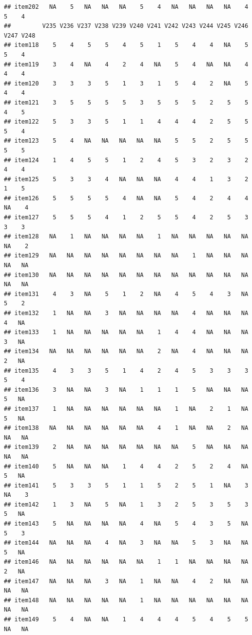\documentclass[
  man]{apa6}
\begin{document}
\begin{verbatim}
## item202   NA    5   NA   NA   NA    5    4   NA   NA   NA   NA    4    5    4
##         V235 V236 V237 V238 V239 V240 V241 V242 V243 V244 V245 V246 V247 V248
## item118    5    4    5    5    4    5    1    5    4    4   NA    5    5    4
## item119    3    4   NA    4    2    4   NA    5    4   NA   NA    4    4    4
## item120    3    3    3    5    1    3    1    5    4    2   NA    5    4    4
## item121    3    5    5    5    5    3    5    5    5    2    5    5    4    5
## item122    5    3    3    5    1    1    4    4    4    2    5    5    5    4
## item123    5    4   NA   NA   NA   NA   NA    5    5    2    5    5    5    5
## item124    1    4    5    5    1    2    4    5    3    2    3    2    4    4
## item125    5    3    3    4   NA   NA   NA    4    4    1    3    2    1    5
## item126    5    5    5    5    4   NA   NA    5    4    2    4    4   NA    4
## item127    5    5    5    4    1    2    5    5    4    2    5    3    3    3
## item128   NA    1   NA   NA   NA   NA    1   NA   NA   NA   NA   NA   NA    2
## item129   NA   NA   NA   NA   NA   NA   NA   NA    1   NA   NA   NA   NA   NA
## item130   NA   NA   NA   NA   NA   NA   NA   NA   NA   NA   NA   NA   NA   NA
## item131    4    3   NA    5    1    2   NA    4    5    4    3   NA    5    2
## item132    1   NA   NA    3   NA   NA   NA   NA    4   NA   NA   NA    4   NA
## item133    1   NA   NA   NA   NA   NA    1    4    4   NA   NA   NA    3   NA
## item134   NA   NA   NA   NA   NA   NA    2   NA    4   NA   NA   NA    2   NA
## item135    4    3    3    5    1    4    2    4    5    3    3    3    5    4
## item136    3   NA   NA    3   NA    1    1    1    5   NA   NA   NA    5   NA
## item137    1   NA   NA   NA   NA   NA   NA    1   NA    2    1   NA    5   NA
## item138   NA   NA   NA   NA   NA   NA    4    1   NA   NA    2   NA   NA   NA
## item139    2   NA   NA   NA   NA   NA   NA   NA    5   NA   NA   NA   NA   NA
## item140    5   NA   NA   NA    1    4    4    2    5    2    4   NA    5   NA
## item141    5    3    3    5    1    1    5    2    5    1   NA    3   NA    3
## item142    1    3   NA    5   NA    1    3    2    5    3    5    3    5   NA
## item143    5   NA   NA   NA   NA    4   NA    5    4    3    5   NA    5    3
## item144   NA   NA   NA    4   NA    3   NA   NA    5    3   NA   NA    5   NA
## item146   NA   NA   NA   NA   NA   NA    1    1   NA   NA   NA   NA    2   NA
## item147   NA   NA   NA    3   NA    1   NA   NA    4    2   NA   NA   NA   NA
## item148   NA   NA   NA   NA   NA    1   NA   NA   NA   NA   NA   NA   NA   NA
## item149    5    4   NA   NA    1    4    4    4    5    4    5    5   NA   NA

\end{verbatim}
\end{document}
